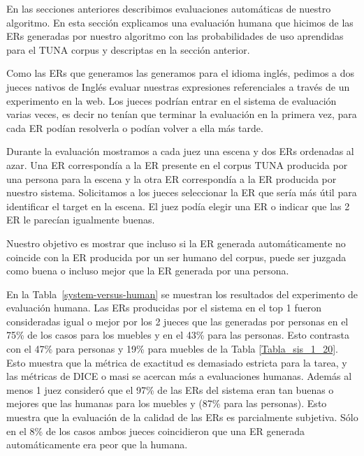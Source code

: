 \begin{table}[H]
En las secciones anteriores describimos evaluaciones autom\'aticas de nuestro algoritmo. En esta secci\'on explicamos una evaluaci\'on humana que hicimos de las ERs generadas por nuestro algoritmo con las probabilidades de uso aprendidas para el TUNA corpus y descriptas en la secci\'on anterior.  

Como las ERs que generamos las generamos para el idioma ingl\'es, pedimos a dos jueces nativos de Ingl\'es evaluar nuestras expresiones referenciales a trav\'es de un experimento en la web. Los jueces podr\'{i}an entrar en el sistema de evaluaci\'on varias veces, es decir no ten\'ian que terminar la evaluaci\'on en la primera vez, para cada ER pod\'ian resolverla o pod\'ian volver a ella m\'as tarde. 

Durante la evaluaci\'on mostramos a cada juez una escena y dos ERs ordenadas al azar. Una ER correspond\'ia a la ER presente en el corpus TUNA producida por una persona para la escena y la otra ER correspond\'ia a la ER producida por nuestro sistema. Solicitamos a los jueces seleccionar la ER que ser\'{i}a m\'as \'util para identificar el target en la escena. El juez pod\'ia elegir una ER o indicar que las 2 ER le parec\'ian igualmente buenas.

Nuestro objetivo es mostrar que incluso si la ER generada autom\'aticamente no coincide con la ER producida por un ser humano del corpus, puede ser juzgada como buena o incluso mejor que la ER generada por una persona.

En la Tabla~\ref{system-versus-human} se muestran los resultados del experimento de evaluaci\'on humana.
Las ERs producidas por el sistema en el top 1 fueron consideradas igual o mejor por los 2 jueces que las generadas por personas en el 75\% de los casos para los muebles y en el 43\% para las personas. Esto contrasta con el 47\% para personas y 19\% para muebles de la Tabla \ref{Tabla_sis_1_20}. Esto muestra que la m\'etrica de exactitud es demasiado estricta para la tarea, y las m\'etricas de DICE o masi se acercan m\'as a evaluaciones humanas. Adem\'as al menos 1 juez consider\'o que el 97\% de las ERs del sistema eran tan buenas o mejores que las humanas para los muebles y (87\% para las personas). Esto muestra que la evaluaci\'on de la calidad de las ERs es parcialmente subjetiva. S\'olo en el 8\% de los casos ambos jueces coincidieron que una ER generada autom\'aticamente era peor que la humana.


\end{table}
